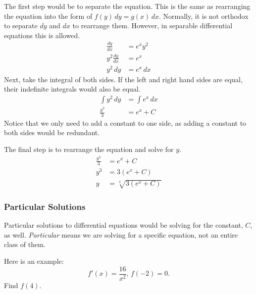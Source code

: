 \documentclass[12pt]{article}
\begin{document}
The first step would be to separate the equation. This is the same as rearranging the equation into the form of $f(y) \, dy = g(x) \, dx$. Normally, it is not orthodox to separate $dy$ and $dx$ to rearrange them. However, in separable differential equations this is allowed.
\begin{align*}
    \frac{dy}{dx}     & = e^x y^2   \\[6pt]
    y^2 \frac{dy}{dx} & = e^x       \\[6pt]
    y^2 \, dy         & = e^x \, dx
\end{align*}
Next, take the integral of both sides. If the left and right hand sides are equal, their indefinite integrals would also be equal.
\begin{align*}
    \int y^2 \, dy & = \int e^x \, dx \\
    \frac{y^3}{3}  & = e^x + C
\end{align*}
Notice that we only need to add a constant to one side, as adding a constant to both sides would be redundant.

\noindent The final step is to rearrange the equation and solve for $y$.
\begin{align*}
    \frac{y^3}{3} & = e^x + C                            \\[6pt]
    y^3           & = 3 \left( e^x + C \right)           \\
    y             & = \sqrt[3]{3 \left( e^x + C \right)}
\end{align*}

\subsubsection{Particular Solutions}
Particular solutions to differential equations would be solving for the constant, $C$, as well. \textit{Particular} means we are solving for a specific equation, not an entire class of them.

\noindent Here is an example:
\[ f'(x) = \frac{16}{x^2}, \, f(-2) = 0. \]
Find $f(4)$.
\end{document}
